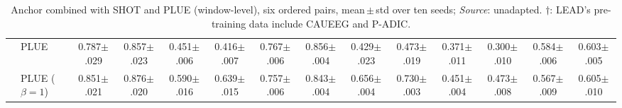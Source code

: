\documentclass[letterpaper]{article} %
\begin{document}
\begin{table}[!t]
\begin{tabular}{ll cc cc cc cc cc cc}
     & PLUE & 0.787{$\pm$.029} & 0.857{$\pm$.023} & 0.451{$\pm$.006} & 0.416{$\pm$.007} & 0.767{$\pm$.006} & 0.856{$\pm$.004} & 0.429{$\pm$.023} & 0.473{$\pm$.019} & 0.371{$\pm$.011} & 0.300{$\pm$.010} & 0.584{$\pm$.006} & 0.603{$\pm$.005} \\
     & PLUE ($\beta{=}1$) & 0.851{$\pm$.021} & 0.876{$\pm$.020} & 0.590{$\pm$.016} & 0.639{$\pm$.015} & 0.757{$\pm$.006} & 0.843{$\pm$.004} & 0.656{$\pm$.004} & 0.730{$\pm$.003} & 0.451{$\pm$.004} & 0.473{$\pm$.008} & 0.567{$\pm$.009} & 0.605{$\pm$.010} \\
    \bottomrule\end{tabular}
    \caption{Anchor combined with SHOT and PLUE (window-level), six ordered pairs,
    mean\,$\pm$\,std over ten seeds; \emph{Source}: unadapted.
    $\dagger$: LEAD's pre-training data include CAUEEG and P-ADIC.}
    \label{tab:modular}
    \end{table}




\end{document}
